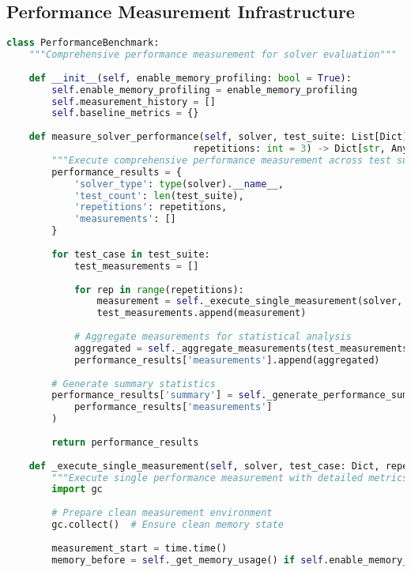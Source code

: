 \subsection{Performance Measurement Infrastructure}
\label{appendix:performance-measurement}

\begin{lstlisting}[language=Python, caption=Performance Measurement Infrastructure]
class PerformanceBenchmark:
    """Comprehensive performance measurement for solver evaluation"""
    
    def __init__(self, enable_memory_profiling: bool = True):
        self.enable_memory_profiling = enable_memory_profiling
        self.measurement_history = []
        self.baseline_metrics = {}
    
    def measure_solver_performance(self, solver, test_suite: List[Dict], 
                                 repetitions: int = 3) -> Dict[str, Any]:
        """Execute comprehensive performance measurement across test suite"""
        performance_results = {
            'solver_type': type(solver).__name__,
            'test_count': len(test_suite),
            'repetitions': repetitions,
            'measurements': []
        }
        
        for test_case in test_suite:
            test_measurements = []
            
            for rep in range(repetitions):
                measurement = self._execute_single_measurement(solver, test_case, rep)
                test_measurements.append(measurement)
            
            # Aggregate measurements for statistical analysis
            aggregated = self._aggregate_measurements(test_measurements)
            performance_results['measurements'].append(aggregated)
        
        # Generate summary statistics
        performance_results['summary'] = self._generate_performance_summary(
            performance_results['measurements']
        )
        
        return performance_results
    
    def _execute_single_measurement(self, solver, test_case: Dict, repetition: int) -> Dict:
        """Execute single performance measurement with detailed metrics"""
        import gc
        
        # Prepare clean measurement environment
        gc.collect()  # Ensure clean memory state
        
        measurement_start = time.time()
        memory_before = self._get_memory_usage() if self.enable_memory_profiling else 0
        

\end{lstlisting}
